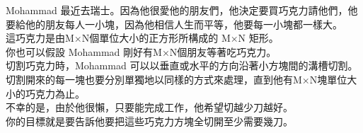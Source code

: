 Mohammad 最近去瑞士。因為他很愛他的朋友們，他決定要買巧克力請他們，他要給他的朋友每人一小塊，因為他相信人生而平等，他要每一小塊都一樣大。\\
這巧克力是由M×N個單位大小的正方形所構成的 M×N 矩形。\\
你也可以假設 Mohammad 剛好有M×N個朋友等著吃巧克力。\\
切割巧克力時，Mohammad 可以以垂直或水平的方向沿著小方塊間的溝槽切割。\\
切割開來的每一塊也要分別單獨地以同樣的方式來處理，直到他有M×N塊單位大小的巧克力為止。\\
不幸的是，由於他很懶，只要能完成工作，他希望切越少刀越好。\\
你的目標就是要告訴他要把這些巧克力方塊全切開至少需要幾刀。\\